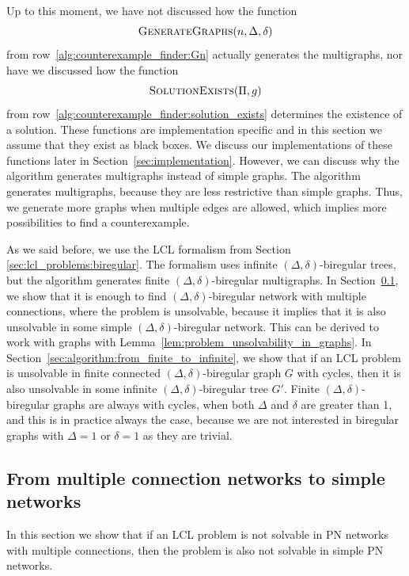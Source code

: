 Up to this moment, we have not discussed how the function \[ \textsc{GenerateGraphs}(n, \Delta, \delta) \] from row~\ref{alg:counterexample_finder:Gn} actually generates the multigraphs, nor have we discussed how the function \[ \textsc{SolutionExists}(\Pi, g) \] from row~\ref{alg:counterexample_finder:solution_exists} determines the existence of a solution.
These functions are implementation specific and in this section we assume that they exist as black boxes.
We discuss our implementations of these functions later in Section~\ref{sec:implementation}.
However, we can discuss why the algorithm generates multigraphs instead of simple graphs.
The algorithm generates multigraphs, because they are less restrictive than simple graphs.
Thus, we generate more graphs when multiple edges are allowed, which implies more possibilities to find a counterexample.

As we said before, we use the LCL formalism from Section \ref{sec:lcl_problems:biregular}.
The formalism uses infinite $(\Delta, \delta)$-biregular trees, but the algorithm generates finite $(\Delta, \delta)$-biregular multigraphs.
In Section~\ref{sec:algorithm:from_multiple_to_simple}, we show that it is enough to find $(\Delta, \delta)$-biregular network with multiple connections, where the problem is unsolvable, because it implies that it is also unsolvable in some simple $(\Delta, \delta)$-biregular network.
This can be derived to work with graphs with Lemma~\ref{lem:problem_unsolvability_in_graphs}.
In Section~\ref{sec:algorithm:from_finite_to_infinite}, we show that if an LCL problem is unsolvable in finite connected $(\Delta, \delta)$-biregular graph $G$ with cycles, then it is also unsolvable in some infinite $(\Delta, \delta)$-biregular tree $G'$.
Finite $(\Delta, \delta)$-biregular graphs are always with cycles, when both $\Delta$ and $\delta$ are greater than 1, and this is in practice always the case, because we are not interested in biregular graphs with $\Delta=1$ or $\delta=1$ as they are trivial.


\subsection{From multiple connection networks to simple networks} \label{sec:algorithm:from_multiple_to_simple}

In this section we show that if an LCL problem is not solvable in PN networks with multiple connections, then the problem is also not solvable in simple PN networks.

